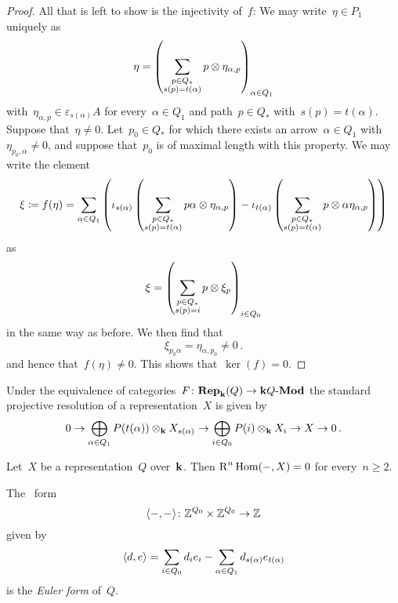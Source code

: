 \begin{proof}
  All that is left to show is the injectivity of~$f$:
  We may write~$\eta \in P_1$ uniquely as
  \[
    \eta
    =
    \left(
      \sum_{\substack{p \in Q_* \\ s(p) = t(\alpha)}}
      p \otimes \eta_{\alpha,p}
    \right)_{\alpha \in Q_1}
  \]
  with~$\eta_{\alpha, p} \in \varepsilon_{s(\alpha)} A$ for every~$\alpha \in Q_1$ and path~$p \in Q_*$ with~$s(p) = t(\alpha)$.
  Suppose that~$\eta \neq 0$.
  Let~$p_0 \in Q_*$ for which there exists an arrow~$\alpha \in Q_1$ with~$\eta_{p_0, \alpha} \neq 0$, and suppose that~$p_0$ is of maximal length with this property.
 We may write the element
  \[
    \xi
    \coloneqq
    f(\eta)
    =
    \sum_{\alpha \in Q_1}
    \left(
      \iota_{s(\alpha)}
      \left(
        \sum_{\substack{p \in Q_* \\ s(p) = t(\alpha)}}
        p \alpha \otimes \eta_{\alpha,p}
      \right)
      -
      \iota_{t(\alpha)}
      \left(
        \sum_{\substack{p \in Q_* \\ s(p) = t(\alpha)}}
        p \otimes \alpha \eta_{\alpha,p}
      \right)
    \right)
  \]
  as
  \[
    \xi
    =
    \left(
      \sum_{\substack{p \in Q_* \\ s(p) = i}}
      p \otimes \xi_p
    \right)_{i \in Q_0}
  \]
  in the same way as before.
  We then find that
  \[
    \xi_{p_0 \alpha}
    =
    \eta_{\alpha, p_0}
    \neq
    0 \,.
  \]
  and hence that~$f(\eta) \neq 0$.
  This shows that~$\ker(f) = 0$.
\end{proof}


\begin{remark}
  Under the equivalence of categories~$F \colon \mathbf{Rep}_{\mathbf{k}}(Q) \to \text{$\mathbf{k} Q$-$\mathbf{Mod}$}$ the standard projective resolution of a representation~$X$ is given by
  \[
    0
    \to
    \bigoplus_{\alpha \in Q_1}
    P(t(\alpha)) \otimes_{\mathbf{k}} X_{s(\alpha)}
    \to
    \bigoplus_{i \in Q_0}
    P(i) \otimes_{\mathbf{k}} X_i
    \to
    X
    \to
    0 \,.
  \]
\end{remark}


\begin{corollary}
  Let~$X$ be a representation~$Q$ over~$\mathbf{k}$.
  Then $\operatorname{R}^n \operatorname{Hom}(-,X) = 0$ for every~$n \geq 2$.
\end{corollary}


\begin{definition}
  The~ form
  \[
    \langle-,-\rangle
    \colon
    \mathbb{Z}^{Q_0} \times \mathbb{Z}^{Q_0}
    \to
    \mathbb{Z}
  \]
  given by
  \[
    \langle d,e\rangle
    =
    \sum_{i \in Q_0}
    d_i e_i
    -
    \sum_{\alpha \in Q_1}
    d_{s(\alpha)} e_{t(\alpha)}
  \]
  is the \emph{Euler form} of~$Q$.
\end{definition}


